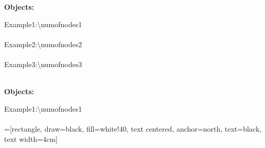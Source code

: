 \documentclass{article}
\begin{document}
\newpage
\begin{center}
\textbf{{\Large Objects:}}
\end{center}
Example1:{{\textbackslash}numofnodes{1}{\\}}\\
Example2:{{\textbackslash}numofnodes{2}{\\}}\\
Example3:{{\textbackslash}numofnodes{3}{\\}}\\
\newpage
\begin{center}
\textbf{{\Large Objects:}}
\end{center}
Example1:{{\textbackslash}numofnodes{1}{\\}}\\
=[rectangle, draw=black, fill=white!40,
        text centered, anchor=north, text=black, text width=4cm]
\usetikzlibrary{arrows,positioning,shapes}
\newcommand{\numofnodes}{1}

\newcommand{\Caption}{Caption Here}

\newcommand{\ObjectName}{LinkedList\textlangle student\textrangle}
\newcommand{\LLHead}{}
\newcommand{\LLTail}{null}
\newcommand{\LLSize}{\numofnodes}

\newcommand{\NName}{Node\textlangle student\textrangle}
\newcommand{\NValue}{}
\newcommand{\NNext}{}
\newcommand{\NPrev}{null}

\newcommand{\VTop}{Student}
\newcommand{\VName}{Jim}
\newcommand{\VNum}{123}
\newcommand{\VAddr}{}

\newcommand{\AName}{Address}
\newcommand{\AStreet}{33 Blank St}
\newcommand{\ACity}{Glassboro}
\newcommand{\AState}{NJ}
\newcommand{\AZip}{08080}

\newcommand{\TName}{Tail}
\newcommand{\THead}{null}
\newcommand{\TTail}{}
\newcommand{\TSize}{null}
\end{document}
